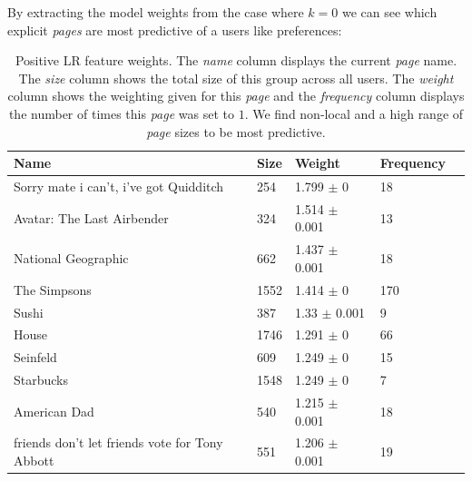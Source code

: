 By extracting the model weights from the case where $k=0$ we can see which explicit \emph{pages} are most predictive of a users like preferences:
\begin{table}[h]
\begin{minipage}[b]{1.0\textwidth}
\centering
  \begin{tabular}{|l|l|l|l|l|} %
  \hline
  \textbf{Name} & \textbf{Size} & \textbf{Weight} & \textbf{Frequency} \\ \hline
\small{Sorry mate i can't, i've got Quidditch}  & 254 & 1.799 $\pm$ 0 & 18 \\ \hline
\small{Avatar: The Last Airbender}  & 324 & 1.514 $\pm$ 0.001 & 13 \\ \hline
\small{National Geographic}  & 662 & 1.437 $\pm$ 0.001 & 18 \\ \hline
\small{The Simpsons}  & 1552 & 1.414 $\pm$ 0 & 170 \\ \hline
\small{Sushi}  & 387 & 1.33 $\pm$ 0.001 & 9 \\ \hline
\small{House}  & 1746 & 1.291 $\pm$ 0 & 66 \\ \hline
\small{Seinfeld}  & 609 & 1.249 $\pm$ 0 & 15 \\ \hline
\small{Starbucks}  & 1548 & 1.249 $\pm$ 0 & 7 \\ \hline
\small{American Dad}  & 540 & 1.215 $\pm$ 0.001 & 18 \\ \hline
\small{friends don't let friends vote for Tony Abbott}  & 551 & 1.206 $\pm$ 0.001 & 19 \\ \hline
  \end{tabular}
 \caption{Positive LR feature weights. The \emph{name} column displays the current \emph{page} name.
  The \emph{size} column shows the total size of this group across all users.
  The \emph{weight} column shows the weighting given for this \emph{page} and the \emph{frequency} column displays the number of times 
  this \emph{page} was set to $1$. We find non-local and a high range of \emph{page} sizes to be most predictive.}
\end{minipage}
\end{table}

